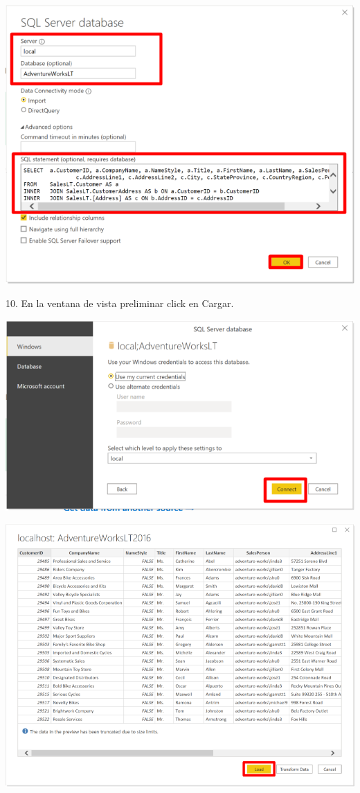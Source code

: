 \documentclass[12pt,letterpaper]{article}
\begin{document}
\begin{center}
    \includegraphics[width=15cm]{img/10.png}  
\end{center}
10. En la ventana de vista preliminar click en Cargar.
\begin{center}
    \includegraphics[width=15cm]{img/11.png}  
\end{center}
\begin{center}
    \includegraphics[width=15cm]{img/12.png}  
\end{center}
\end{document}

